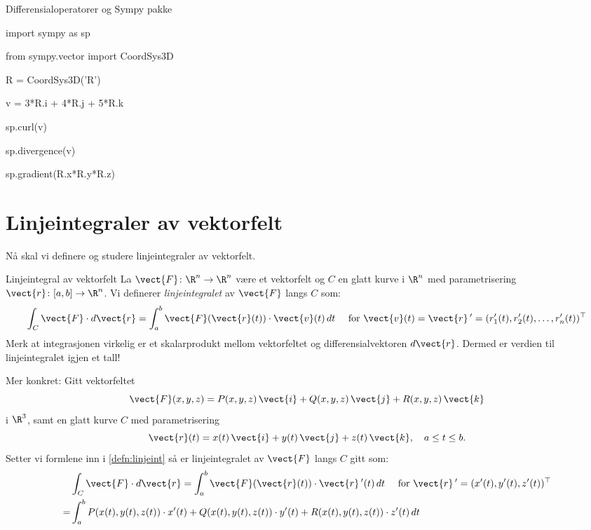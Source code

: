 \begin{oppsum}{Differensialoperatorer og Sympy pakke}
\begin{minipage}{.9\columnwidth}
\begin{lst}{}
import sympy as sp

from sympy.vector import CoordSys3D

R = CoordSys3D('R')

v = 3*R.i + 4*R.j + 5*R.k

sp.curl(v)

sp.divergence(v)

sp.gradient(R.x*R.y*R.z)
\end{lst}
\end{minipage}
\end{oppsum}
\section{Linjeintegraler av vektorfelt}\label{sect:linint2}

Nå skal vi definere og studere linjeintegraler av vektorfelt. 

\begin{defn}{Linjeintegral av vektorfelt}
La $\vect{F} \colon \R^n \rightarrow \R^n$ være et vektorfelt og $C$ en glatt kurve i $\R^n$ med parametrisering $\vect{r} \colon [a,b] \rightarrow \R^n$. Vi definerer \emph{linjeintegralet} av \( \vect{F} \) langs \( C \) som:
\begin{align}\label{defn:linjeint}
\int_C \vect{F} \cdot d\vect{r} = \int_a^b \vect{F}(\vect{r}(t)) \cdot \vect{v}(t)\, dt \quad \text{ for } \vect{v}(t)=\vect{r}\,'=(r_1'(t),r_2'(t),\ldots, r_n'(t))^\top
\end{align}
Merk at integrasjonen virkelig er et skalarprodukt mellom vektorfeltet og differensialvektoren \( d\vect{r} \). Dermed er verdien til linjeintegralet igjen et tall!
\end{defn}
Mer konkret: Gitt vektorfeltet 
\[
\vect{F}(x, y, z) = P(x, y, z)\, \vect{i} + Q(x, y, z)\, \vect{j} + R(x, y, z)\, \vect{k}
\]
i $\R^3$, samt en glatt kurve \( C \) med parametrisering
\[
\vect{r}(t) = x(t)\, \vect{i} + y(t)\, \vect{j} + z(t)\, \vect{k}, \quad a \leq t \leq b.
\]
Setter vi formlene inn i \eqref{defn:linjeint} så er linjeintegralet av \( \vect{F} \) langs \( C \) gitt som:
\begin{align*}
&\int_C \vect{F} \cdot d\vect{r} = \int_a^b \vect{F}(\vect{r}(t)) \cdot \vect{r}\,'(t)\, dt \quad \text{ for } \vect{r}\,'=(x'(t),y'(t),z'(t))^\top \\=&\int_a^b P(x(t),y(t),z(t)) \cdot x'(t) + Q(x(t),y(t),z(t))\cdot y'(t) + R(x(t),y(t),z(t)) \cdot z'(t)\, dt
\end{align*}


